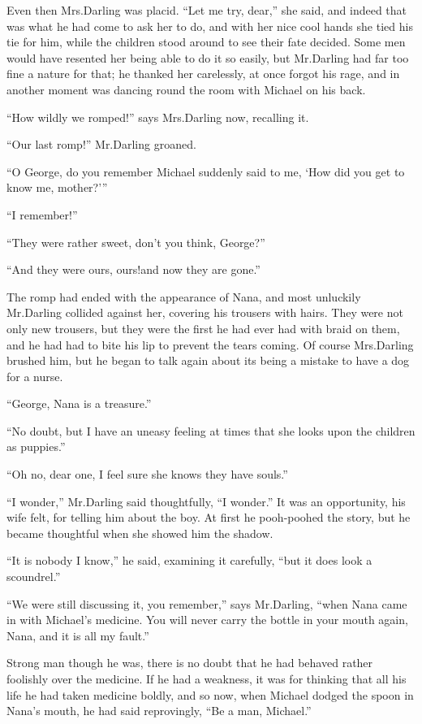 Even then Mrs.\@ Darling was placid.
“Let me try, dear,” she said,
and indeed that was what he had come to ask her to do,
and with her nice cool hands she tied his tie for him,
while the children stood around to see their fate decided.
Some men would have resented her being able to do it so easily,
but Mr.\@ Darling had far too fine a nature for that;
he thanked her carelessly, at once forgot his rage,
and in another moment was dancing round the room with Michael on his back.

“How wildly we romped!\@” says Mrs.\@ Darling now, recalling it.

“Our last romp!\@” Mr.\@ Darling groaned.

“O George, do you remember Michael suddenly said to me,
‘How did you get to know me, mother?’”

“I remember!”

“They were rather sweet, don’t you think, George?”

“And they were ours, ours!\@ and now they are gone.”

The romp had ended with the appearance of Nana,
and most unluckily Mr.\@ Darling collided against her,
covering his trousers with hairs.
They were not only new trousers,
but they were the first he had ever had with braid on them,
and he had had to bite his lip to prevent the tears coming.
Of course Mrs.\@ Darling brushed him,
but he began to talk again about its being a mistake to have a dog for a nurse.

“George, Nana is a treasure.”

“No doubt, but I have an uneasy feeling at times that she looks upon the children as puppies.”

“Oh no, dear one, I feel sure she knows they have souls.”

“I wonder,” Mr.\@ Darling said thoughtfully, “I wonder.”
It was an opportunity, his wife felt, for telling him about the boy.
At first he pooh-poohed the story, but he became thoughtful when she showed him the shadow.

“It is nobody I know,” he said, examining it carefully, “but it does look a scoundrel.”

“We were still discussing it, you remember,” says Mr.\@ Darling, “when Nana came in with Michael’s medicine.
You will never carry the bottle in your mouth again, Nana, and it is all my fault.”

Strong man though he was, there is no doubt that he had behaved rather foolishly over the medicine.
If he had a weakness, it was for thinking that all his life he had taken medicine boldly,
and so now, when Michael dodged the spoon in Nana’s mouth, he had said reprovingly, “Be a man, Michael.”

